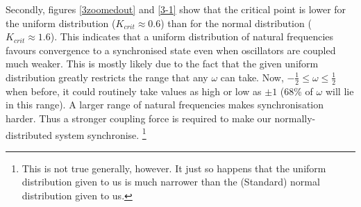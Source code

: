 \documentclass[11pt,a4paper]{article}
\begin{document}
Secondly, figures \ref{3zoomedout} and \ref{3-1} show that the critical point is lower for the uniform distribution ($K_{crit} \approx 0.6$) than for the normal distribution ($K_{crit} \approx 1.6$). 
This indicates that a uniform distribution of natural frequencies favours convergence to a synchronised state even when oscillators are coupled much weaker. 
This is mostly likely due to the fact that the given uniform distribution greatly restricts the range that any $\omega$ can take. 
Now, $-\frac{1}{2} \leq \omega \leq \frac{1}{2}$ when before, it could routinely take values as high or low as $\pm 1$ (68\% of $\omega$ will lie in this range).
A larger range of natural frequencies makes synchronisation harder. 
Thus a stronger coupling force is required to make our normally-distributed system synchronise.%
	\footnote{This is not true generally, however. It just so happens that the uniform distribution given to us is much narrower than the (Standard) normal distribution given to us.}
\end{document}
